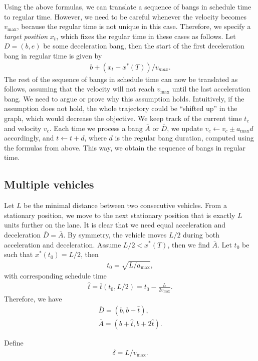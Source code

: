 \documentclass[a4paper]{article}
\theoremstyle{definition}
\theoremstyle{plain}
\begin{document}
Using the above formulas, we can translate a sequence of bangs in schedule time
to regular time. However, we need to be careful whenever the velocity becomes
$v_{\max}$, because the regular time is not unique in this case. Therefore, we
specify a \textit{target position} $x_{t}$, which fixes the regular time in
these cases as follows. Let $D=(b,e)$ be some deceleration bang, then the start
of the first deceleration bang in regular time is given by
\begin{align*}
  b + (x_{t} - x^{*}(T)) / v_{max} .
\end{align*}
%
The rest of the sequence of bangs in schedule time can now be translated as
follows, assuming that the velocity will not reach $v_{\max}$ until the last
acceleration bang. {\color{blue} We need to argue or prove why this assumption
  holds. Intuitively, if the assumption does not hold, the whole trajectory
  could be ``shifted up'' in the graph, which would decrease the objective.} We
keep track of the current time $t_{c}$ and velocity $v_{c}$. Each time we
process a bang $\bar{A}$ or $\bar{D}$, we update $v_{c} \leftarrow v_{c} \pm a_{\max} d$
accordingly, and $t \leftarrow t + d$, where $d$ is the regular bang duration, computed
using the formulas from above. This way, we obtain the sequence of bangs in
regular time.

\subsection*{Multiple vehicles}

Let $L$ be the minimal distance between two consecutive vehicles. From a
stationary position, we move to the next stationary position that is exactly $L$
units further on the lane. It is clear that we need equal acceleration and
deceleration $\bar{D}=\bar{A}$. By symmetry, the vehicle moves $L/2$ during both
acceleration and deceleration.
%
Assume $L/2 < x^{*}(T)$, then we find $\bar{A}$.
Let $t_{0}$ be such that $x^{*}(t_{0}) = L/2$, then
\begin{align*}
t_{0} = \sqrt{L / a_{\max}} ,
\end{align*}
with corresponding schedule time
\begin{align*}
  \hat{t} = \bar{t}(t_{0}, L/2) = t_{0} - \frac{L}{2 v_{\max}} .
\end{align*}
Therefore, we have
\begin{align*}
  \bar{D} = (b, b + \hat{t}) , \\
  \bar{A} = (b + \hat{t}, b + 2 \hat{t}) .
\end{align*}


Define
\begin{align*}
  \delta = L / v_{\max} .
\end{align*}
\end{document}
